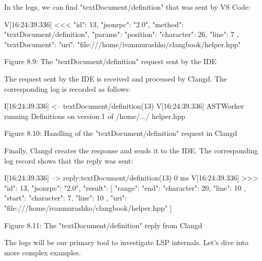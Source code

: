 In the logs, we can find "textDocument/definition" that was sent by VS Code:

\begin{shell}
V[16:24:39.336] <<< {
    "id": 13,
    "jsonrpc": "2.0",
    "method": "textDocument/definition",
    "params": {
        "position": {
            "character": 26,
            "line": 7
        },
        "textDocument": {
            "uri": "file:///home/ivanmurashko/clangbook/helper.hpp"
        }
    }
}
\end{shell}


\begin{center}
Figure 8.9: The "textDocument/definition" request sent by the IDE
\end{center}

The request sent by the IDE is received and processed by Clangd. The corresponding log is recorded as follows:

\begin{shell}
I[16:24:39.336] <-- textDocument/definition(13)
V[16:24:39.336] ASTWorker running Definitions on version 1 of /home/.../
helper.hpp
\end{shell}


\begin{center}
Figure 8.10: Handling of the "textDocument/definition" request in Clangd
\end{center}

Finally, Clangd creates the response and sends it to the IDE. The corresponding log record shows that the reply was sent:

\begin{shell}
I[16:24:39.336] --> reply:textDocument/definition(13) 0 ms
V[16:24:39.336] >>> {
    "id": 13,
    "jsonrpc": "2.0",
    "result": [
    {
        "range": {
            "end": {
                "character": 20,
                "line": 10
            },
            "start": {
                "character": 7,
                "line": 10
            }
        },
        "uri": "file:///home/ivanmurashko/clangbook/helper.hpp"
    }
    ]
}
\end{shell}


\begin{center}
Figure 8.11: The "textDocument/definition" reply from Clangd
\end{center}

The logs will be our primary tool to investigate LSP internals. Let's dive into more complex examples.



